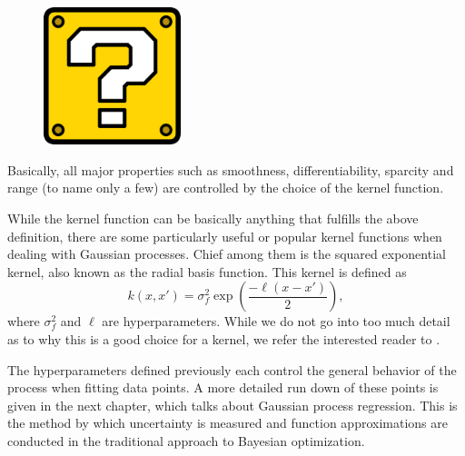 \begin{figure}[h]
	\includegraphics[width=4cm]{Figures/missing.png}
	\centering
	\label{trajectories}
\end{figure}

Basically, all major properties such as smoothness, differentiability, sparcity and range (to name only a few) are controlled by the choice of the kernel function. 

While the kernel function can be basically anything that fulfills the above definition, there are some particularly useful or popular kernel functions when dealing with Gaussian processes. Chief among them is the squared exponential kernel, also known as the radial basis function. This kernel is defined as
\[ k(x, x') = \sigma_f^2 \exp \left( \frac{- \ell (x - x')}{2} \right), \]
where $\sigma_f^2$ and $\ell$ are hyperparameters. While we do not go into too much detail as to why this is a good choice for a kernel, we refer the interested reader to \cite[\S 2.1]{garnett_bayesoptbook_2023}. 

The hyperparameters defined previously each control the general behavior of the process when fitting data points. A more detailed run down of these points is given in the next chapter, which talks about Gaussian process regression. This is the method by which uncertainty is measured and function approximations are conducted in the traditional approach to Bayesian optimization. 





